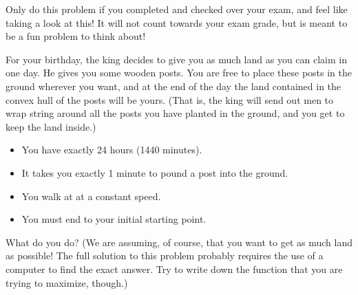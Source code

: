 \documentclass[10pt]{amsart}
\begin{document}
\begin{enumerate}
\vfill\pagebreak

 Only do this
problem if you completed and checked over your exam, and feel like
taking a look at this!  It will not count
towards your exam grade, but is meant to be a fun problem to think
about!

For your birthday, the king decides to give you as much land as you can
claim in one day.  He gives you some wooden posts.  You are free to place
these posts in the ground wherever you want, and at the end of the day the
land contained in the convex hull of the posts will be yours. (That
is, the king will send out men to wrap string around all the posts you 
have planted in the ground, and you get to keep the land inside.)

\begin{itemize}
\item You have exactly 24 hours (1440 minutes).
\item It takes you exactly 1 minute to pound a post into the ground.
\item You walk at at a constant speed.
\item You must end to your initial starting point.
\end{itemize}
What do you do? (We are assuming, of course, that you want to get as
much land as possible!  The full solution to this problem probably
requires the use of a computer to find the exact answer.  Try to write 
down the function that you are trying to maximize, though.)


\end{enumerate}
\end{document}
